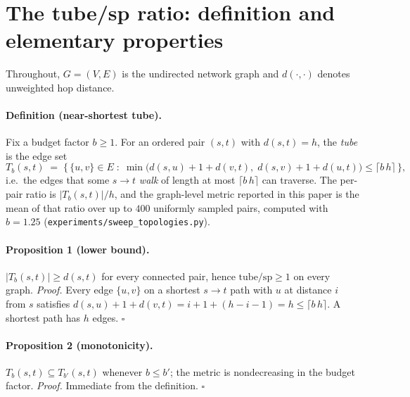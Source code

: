 \section{The tube/sp ratio: definition and elementary properties}
\label{app:tubesp}

Throughout, $G=(V,E)$ is the undirected network graph and $d(\cdot,\cdot)$
denotes unweighted hop distance.

\paragraph{Definition (near-shortest tube).}
Fix a budget factor $b \geq 1$. For an ordered pair $(s,t)$ with
$d(s,t) = h$, the \emph{tube} is the edge set
\[
T_b(s,t) \;=\; \bigl\{\, \{u,v\} \in E \;:\;
\min\bigl(d(s,u) + 1 + d(v,t),\; d(s,v) + 1 + d(u,t)\bigr)
\leq \lceil b\,h \rceil \,\bigr\},
\]
i.e.\ the edges that some $s\!\to\!t$ \emph{walk} of length at most
$\lceil b\,h\rceil$ can traverse. The per-pair ratio is $|T_b(s,t)|/h$, and
the graph-level metric reported in this paper is the mean of that ratio
over up to $400$ uniformly sampled pairs, computed with $b = 1.25$
(\texttt{experiments/sweep\_topologies.py}).

\paragraph{Proposition 1 (lower bound).}
$|T_b(s,t)| \geq d(s,t)$ for every connected pair, hence
$\mathrm{tube/sp} \geq 1$ on every graph.
\emph{Proof.} Every edge $\{u,v\}$ on a shortest $s\!\to\!t$ path with $u$
at distance $i$ from $s$ satisfies $d(s,u)+1+d(v,t) = i + 1 + (h-i-1) = h
\leq \lceil b\,h\rceil$. A shortest path has $h$ edges. \hfill$\square$

\paragraph{Proposition 2 (monotonicity).}
$T_b(s,t) \subseteq T_{b'}(s,t)$ whenever $b \leq b'$; the metric is
nondecreasing in the budget factor. \emph{Proof.} Immediate from the
definition. \hfill$\square$

